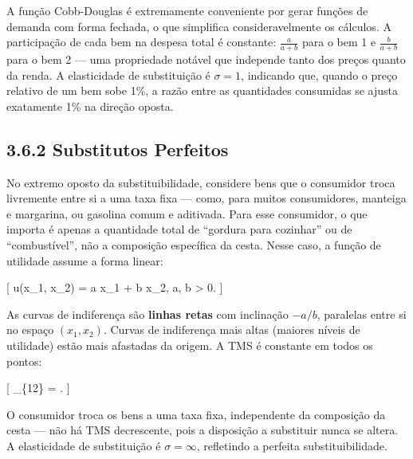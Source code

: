 \documentclass[11pt,twoside,openright]{book}
\begin{document}
A função Cobb-Douglas é extremamente conveniente por gerar funções de
demanda com forma fechada, o que simplifica consideravelmente os
cálculos. A participação de cada bem na despesa total é constante:
\(\frac{a}{a+b}\) para o bem 1 e \(\frac{b}{a+b}\) para o bem 2 --- uma
propriedade notável que independe tanto dos preços quanto da renda. A
elasticidade de substituição é \(\sigma = 1\), indicando que, quando o
preço relativo de um bem sobe 1\%, a razão entre as quantidades
consumidas se ajusta exatamente 1\% na direção oposta.

\subsection{3.6.2 Substitutos Perfeitos}\label{substitutos-perfeitos}

No extremo oposto da substituibilidade, considere bens que o consumidor
troca livremente entre si a uma taxa fixa --- como, para muitos
consumidores, manteiga e margarina, ou gasolina comum e aditivada. Para
esse consumidor, o que importa é apenas a quantidade total de ``gordura
para cozinhar'' ou de ``combustível'', não a composição específica da
cesta. Nesse caso, a função de utilidade assume a forma linear:

{[} u(x\_1, x\_2) = a x\_1 + b x\_2, \quad a, b \textgreater{} 0.
\label{eq:3.6.7}  {]}

As curvas de indiferença são \textbf{linhas retas} com inclinação
\(-a/b\), paralelas entre si no espaço \((x_1, x_2)\). Curvas de
indiferença mais altas (maiores níveis de utilidade) estão mais
afastadas da origem. A TMS é constante em todos os pontos:

{[} \_\{12\} = . \label{eq:3.6.8}  {]}

O consumidor troca os bens a uma taxa fixa, independente da composição
da cesta --- não há TMS decrescente, pois a disposição a substituir
nunca se altera. A elasticidade de substituição é \(\sigma = \infty\),
refletindo a perfeita substituibilidade.
\end{document}
